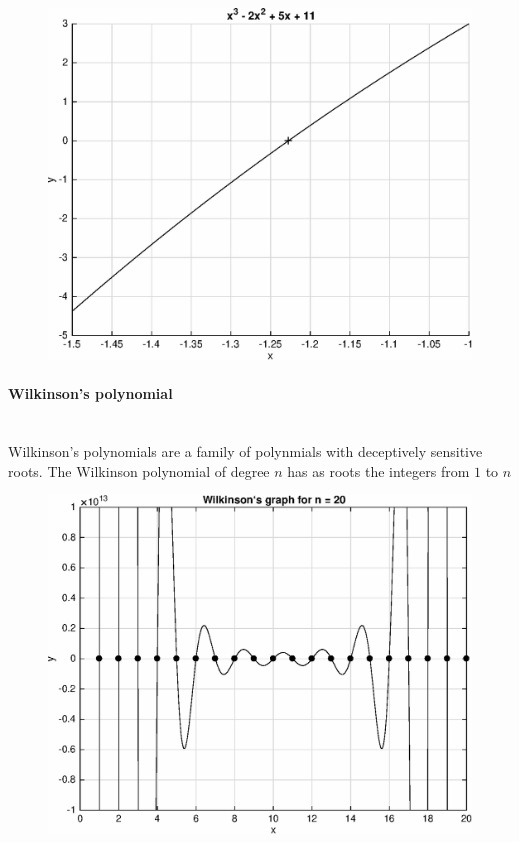 \documentclass[a4paper,12pt]{article}
\begin{document}
\begin{figure}
    \centering
    \includegraphics{graph}
\end{figure} 
\pagebreak
\paragraph{Wilkinson's polynomial}\mbox{}\\

Wilkinson's polynomials are a family of polynmials with deceptively sensitive roots. The Wilkinson polynomial of degree $n$ has as roots the integers from $1$ to $n$

\begin{figure}
    \centering
    \includegraphics{wilkinsons-graph}
\end{figure} 	
\end{document}
